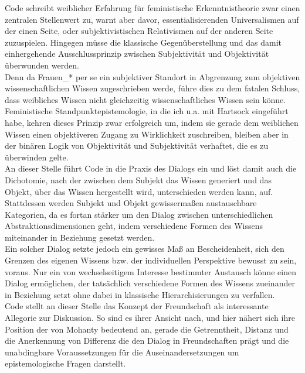 \noindent Code schreibt weiblicher Erfahrung für feministische Erkenntnistheorie zwar
einen zentralen Stellenwert zu, warnt aber davor, essentialisierenden
Universalismen auf der einen Seite, oder subjektivistischen Relativismen auf der
anderen Seite zuzuspielen. Hingegen müsse die klassische Gegenüberstellung und
das damit einhergehende Ausschlussprinzip zwischen Subjektivität und
Objektivität überwunden werden.\\
 Denn da Frauen\_* per se ein subjektiver
Standort in Abgrenzung zum objektiven wissenschaftlichen Wissen zugeschrieben
werde, führe dies zu dem fatalen Schluss, dass weibliches Wissen nicht
gleichzeitig wissenschaftliches Wissen sein könne.\footnotemark
{}\\ 

\noindent Feministische Standpunktepistemologie, in die ich u.a. mit Hartsock eingeführt habe, kehren dieses Prinzip zwar erfolgreich um, indem sie gerade dem weiblichen Wissen einen objektiveren Zugang zu Wirklichkeit zuschreiben, bleiben aber in der binären Logik von Objektivität und Subjektivität verhaftet, die es zu überwinden gelte.\\
An dieser Stelle führt Code in die Praxis des Dialogs ein und löst damit auch die Dichotomie, nach der zwischen dem Subjekt das Wissen generiert und das Objekt, über das Wissen hergestellt wird, unterschieden werden kann, auf.
Stattdessen werden Subjekt und Objekt gewissermaßen austauschbare Kategorien, da
es fortan stärker um den Dialog zwischen unterschiedlichen
Abstraktionsdimensionen geht, indem verschiedene Formen des Wissens miteinander
in Beziehung gesetzt werden.\footnotemark {}\\
Ein solcher Dialog setzte jedoch ein gewisses Maß an Bescheidenheit, sich den
Grenzen des eigenen Wissens bzw. der individuellen Perspektive bewusst zu sein,
voraus. Nur ein von wechselseitigem Interesse bestimmter Austausch könne einen
Dialog ermöglichen, der tatsächlich verschiedene Formen des Wissens zueinander
in Beziehung setzt ohne dabei in klassische Hierarchisierungen zu verfallen.\\
Code stellt an dieser Stelle das Konzept der Freundschaft als interessante
Allegorie zur Diskussion. So sind es ihrer Ansicht nach, und hier nähert sich
ihre Position der von Mohanty bedeutend an, gerade die Getrenntheit, Distanz und
die Anerkennung von Differenz die den Dialog in Freundschaften prägt und die
unabdingbare Voraussetzungen für die Auseinandersetzungen um epistemologische
Fragen darstellt.\footnotemark {}\\

